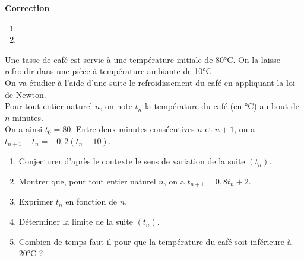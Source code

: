 \documentclass[a4paper,11pt,exos]{nsi} %
\begin{document}
\textcolor{UGLiBlue}{\textbf{Correction}
\begin{enumerate}
    \item {}
    \item {}
\end{enumerate}}



Une tasse de café est servie à une température initiale de 80°C. On la laisse refroidir dans une pièce à température ambiante de 10°C.\\
On va étudier à l'aide d'une suite le refroidissement du café en appliquant la loi de Newton.\\

Pour tout entier naturel $n$, on note $t_n$ la température du café (en °C) au bout de $n$ minutes.\\
On a ainsi $t_0=80$. Entre deux minutes consécutives $n$ et $n+1$, on a $t_{n+1}-t_n=-0,2(t_n-10)$.
\begin{enumerate}
    \item Conjecturer d'après le contexte le sens de variation de la suite $(t_n)$.
    \item Montrer que, pour tout entier naturel $n$, on a $t_{n+1}=0,8t_n+2$.
    \item Exprimer $t_n$ en fonction de $n$.
    \item Déterminer la limite de la suite $(t_n)$.
    \item \faCalculator \hspace*{.2cm} Combien de temps faut-il pour que la température du café soit inférieure à 20°C ?
\end{enumerate}
\end{document}

